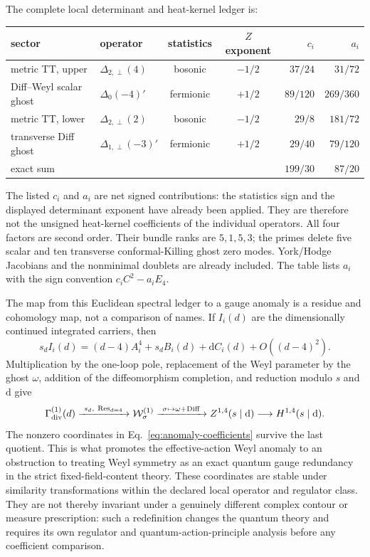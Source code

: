 \documentclass[11pt]{article}
\newcommand{\dd}{\mathrm d}
\begin{document}
The complete local determinant and heat-kernel ledger is:
\begin{center}
\small
\begin{tabularx}{\textwidth}{@{}Ylccrr@{}}
\toprule
sector & operator & statistics & $Z$ exponent & $c_i$ & $a_i$\\
\midrule
metric TT, upper & $\Delta_{2,\perp}(4)$ & bosonic & $-1/2$
  & $37/24$ & $31/72$\\
Diff--Weyl scalar ghost & $\Delta_0(-4)'$ & fermionic & $+1/2$
  & $89/120$ & $269/360$\\
metric TT, lower & $\Delta_{2,\perp}(2)$ & bosonic & $-1/2$
  & $29/8$ & $181/72$\\
transverse Diff ghost & $\Delta_{1,\perp}(-3)'$ & fermionic & $+1/2$
  & $29/40$ & $79/120$\\
\midrule
exact sum &&&& $199/30$ & $87/20$\\
\bottomrule
\end{tabularx}
\end{center}
The listed $c_i$ and $a_i$ are net signed contributions: the statistics sign
and the displayed determinant exponent have already been applied.  They are
therefore not the unsigned heat-kernel coefficients of the individual
operators.
All four factors are second order.  Their bundle ranks are $5,1,5,3$;
the primes delete five scalar and ten transverse conformal-Killing ghost zero
modes.  York/Hodge Jacobians and the nonminimal doublets are already included.
The table lists $a_i$ with the sign convention $c_iC^2-a_iE_4$.

The map from this Euclidean spectral ledger to a gauge anomaly is a residue
and cohomology map, not a comparison of names.  If $I_i(d)$ are the
dimensionally continued integrated carriers, then
\begin{equation}
 s_d I_i(d)=(d-4)A_i^4+s_dB_i(d)+\dd C_i(d)
             +O((d-4)^2).
 \label{eq:anomaly-residue-map}
\end{equation}
Multiplication by the one-loop pole, replacement of the Weyl parameter by the
ghost $\omega$, addition of the diffeomorphism completion, and reduction
modulo $s$ and $\dd$ give
\begin{equation}
 \Gamma^{(1)}_{\rm div}(d)
 \xrightarrow{\ s_d,\ \operatorname{Res}_{d=4}\ }
 \mathcal W^{(1)}_\sigma
 \xrightarrow{\ \sigma\mapsto\omega+\mathrm{Diff}\ }
 Z^{1,4}(s\mid\dd)\longrightarrow H^{1,4}(s\mid\dd).
 \label{eq:determinant-to-bv}
\end{equation}
The nonzero coordinates in Eq.~\eqref{eq:anomaly-coefficients} survive the
last quotient.  This is what promotes the effective-action Weyl anomaly to an
obstruction to treating Weyl symmetry as an exact quantum gauge redundancy
in the strict fixed-field-content theory.  These coordinates are stable
under similarity transformations within the declared local operator and
regulator class.  They are not thereby invariant under a genuinely
different complex contour or measure prescription: such a redefinition
changes the quantum theory and requires its own regulator and
quantum-action-principle analysis before any coefficient comparison.
\end{document}
